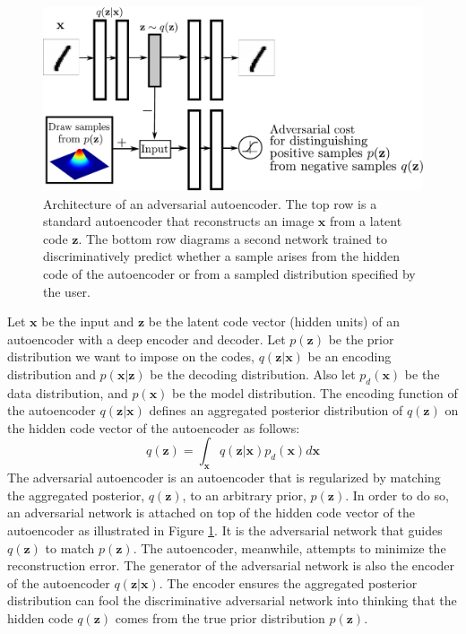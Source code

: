 \documentclass{article}
\begin{document}
\begin{figure}
\begin{center}
\hspace{4cm}\includegraphics[scale=.4]{adv_ae}
\end{center}
\caption{\label{fig_adv_ae}Architecture of an adversarial autoencoder.
The top row is a standard autoencoder that reconstructs an image $\mathbf{x}$ from a latent code $\mathbf{z}$.
The bottom row diagrams a second network trained to discriminatively predict whether a sample arises from the hidden code of the autoencoder or from a sampled distribution specified by the user.}
\end{figure}

Let $\mathbf{x}$ be the input and $\mathbf{z}$ be the latent code vector (hidden units) of an autoencoder with a deep encoder and decoder.
Let $p(\mathbf{z})$ be the prior distribution we want to impose on the codes, $q( \mathbf{z} | \mathbf{x})$ be an encoding distribution
and $p( \mathbf{x} | \mathbf{z})$ be the decoding distribution.
Also let $p_{d} (\mathbf{x})$ be the data distribution, and $p(\mathbf{x})$ be the model distribution.
The encoding function of the autoencoder $q( \mathbf{z} | \mathbf{x})$ defines an aggregated posterior distribution of $q(\mathbf{z})$ on the hidden code vector of the autoencoder as follows:
\begin{equation}\label{qz} q(\mathbf{z}) = \int_\mathbf{x} q(\mathbf{z}|\mathbf{x}) p_{d} (\mathbf{x}) d\mathbf{x}
\end{equation}
The adversarial autoencoder is an autoencoder that is regularized by matching the aggregated posterior, $q(\mathbf{z})$, to an arbitrary prior, $p(\mathbf{z})$.
In order to do so, an adversarial network is attached on top of the hidden code vector of the autoencoder as illustrated in Figure \ref{fig_adv_ae}.
It is the adversarial network that guides $q(\mathbf{z})$ to match $p(\mathbf{z})$. The autoencoder, meanwhile, attempts to minimize the
reconstruction error.  The generator of the adversarial network is also the encoder of the autoencoder $q(\mathbf{z}|\mathbf{x})$.
The encoder ensures the aggregated posterior distribution can fool the discriminative adversarial network into thinking that the hidden code $q(\mathbf{z})$ comes from the true prior distribution $p(\mathbf{z})$.
\end{document}
